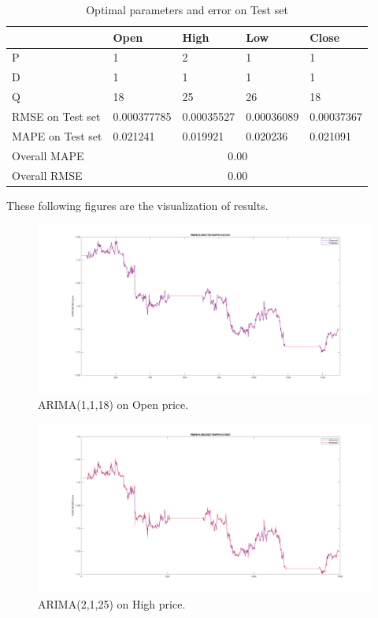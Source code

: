 \documentclass[11pt]{article}
\begin{document}
\begin{table}[H]
\begin{tabular}{|l|l|l|l|l|}
  \hline
  & Open        & High       & Low        & Close      \\ \hline
  P                & 1           & 2          & 1          & 1          \\ \hline
  D                & 1           & 1          & 1          & 1          \\ \hline
  Q                & 18          & 25         & 26         & 18         \\ \hline
  RMSE on Test set & 0.000377785 & 0.00035527 & 0.00036089 & 0.00037367 \\ \hline
  MAPE on Test set & 0.021241    & 0.019921   & 0.020236   & 0.021091   \\ \hline
  Overall MAPE     & \multicolumn{4}{c|}{0.00}                          \\ \hline
  Overall RMSE     & \multicolumn{4}{c|}{0.00}                          \\ \hline
\end{tabular}
\caption{Optimal parameters and error on Test set}
\end{table}
These following figures are the visualization of results.
\begin{figure}[H]
  \centering
  \includegraphics[width=\textwidth,keepaspectratio]{figs/arima_1_1_18_open.png}
  \caption{ARIMA(1,1,18) on Open price.}
\end{figure}

\begin{figure}[H]
  \centering
  \includegraphics[width=\linewidth,keepaspectratio]{figs/arima_2_1_25_high.png}
  \caption{ARIMA(2,1,25) on High price.}
\end{figure}
\end{document}
